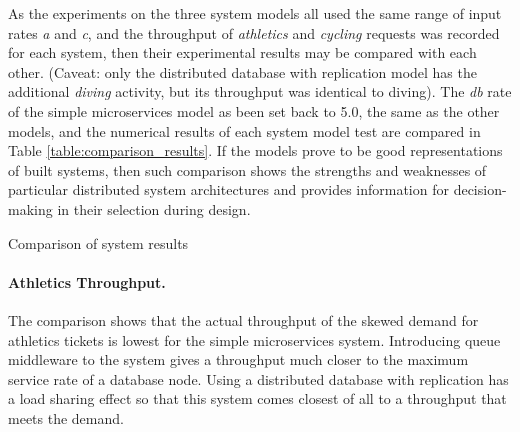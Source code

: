 As the experiments on the three system models all used the same range of input rates {\itshape a} and {\itshape c}, and the throughput of {\itshape athletics} and {\itshape cycling} requests was recorded for each system, then their experimental results may be compared with each other. (Caveat: only the distributed database with replication model has the additional {\itshape diving} activity, but its throughput was identical to diving).  The {\itshape db} rate of the simple microservices model as been set back to 5.0, the same as the other models, and the numerical results of each system model test are compared in Table \ref{table:comparison_results}.  If the models prove to be good representations of built systems, then such comparison shows the strengths and weaknesses of particular distributed system architectures and provides information for decision-making in their selection during design.

\begin{table}[h!]
	\begin{center}
		\caption{Comparison of system results}
		\label{table:comparison_results}
	\end{center}
\end{table}

\paragraph{Athletics Throughput.}  The comparison shows that the actual throughput of the skewed demand for athletics tickets is lowest for the simple microservices system.  Introducing queue middleware to the system gives a throughput much closer to the maximum service rate of a database node.  Using a distributed database with replication has a load sharing effect so that this system comes closest of all to a throughput that meets the demand.

